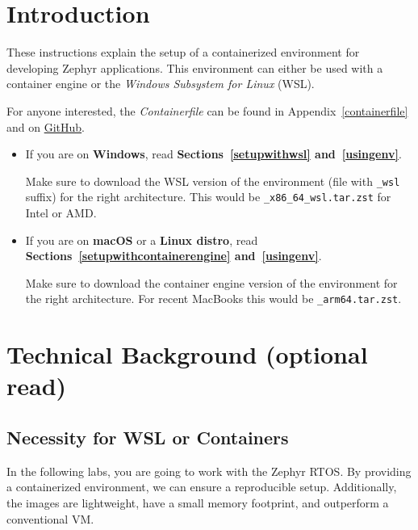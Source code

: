 



\puttitle{}

\section{Introduction}

These instructions explain the setup of a containerized environment for developing Zephyr applications.
This environment can either be used with a container engine or the \emph{Windows Subsystem for Linux} (WSL).

For anyone interested, the \emph{Containerfile} can be found in Appendix~\ref{containerfile}
and on \href{https://github.com/InES-IoT/zephyr_development_environment_container}{GitHub}.

\begin{itemize}
  \item If you are on \textbf{Windows}, read \textbf{Sections~\ref{setupwithwsl} and~\ref{usingenv}}.

    Make sure to download the WSL version of the environment (file with \texttt{\_wsl} suffix) for the right architecture.
    This would be \texttt{\imagename{}\_x86\_64\_wsl.tar.zst} for Intel or AMD.
  \item If you are on \textbf{macOS} or a \textbf{Linux distro}, read \textbf{Sections~\ref{setupwithcontainerengine} and~\ref{usingenv}}.

    Make sure to download the container engine version of the environment for the right architecture.
    For recent MacBooks this would be \texttt{\imagename{}\_arm64.tar.zst}.
\end{itemize}

\newpage

\section{Technical Background (optional read)}

\subsection{Necessity for WSL or Containers}

In the following labs, you are going to work with the Zephyr RTOS.
By providing a containerized environment, we can ensure a reproducible setup.
Additionally, the images are lightweight, have a small memory footprint, and outperform a conventional VM.

